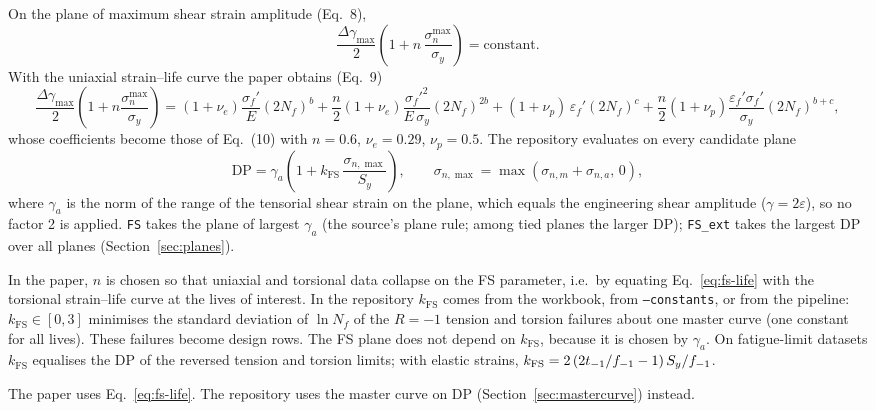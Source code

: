  On the plane of maximum shear strain amplitude (Eq.~8),
\begin{equation}
\frac{\Delta\gamma_{\max}}{2}\left(1+n\,\frac{\sigma_n^{\max}}{\sigma_y}\right)=\text{constant} .
\label{eq:fs-main}
\end{equation}
With the uniaxial strain--life curve the paper obtains (Eq.~9)
\begin{equation}
\frac{\Delta\gamma_{\max}}{2}\left(1+n\frac{\sigma_n^{\max}}{\sigma_y}\right)
=(1+\nu_e)\frac{\sigma_f'}{E}(2N_f)^b+\frac n2(1+\nu_e)\frac{\sigma_f'^2}{E\,\sigma_y}(2N_f)^{2b}
+(1+\nu_p)\,\varepsilon_f'(2N_f)^c+\frac n2(1+\nu_p)\frac{\varepsilon_f'\sigma_f'}{\sigma_y}(2N_f)^{b+c} ,
\label{eq:fs-life}
\end{equation}
whose coefficients become those of Eq.~(10) with $n=0.6$, $\nu_e=0.29$, $\nu_p=0.5$. The repository
evaluates on every candidate plane
\begin{equation}
\mathrm{DP}=\gamma_a\left(1+k_\mathrm{FS}\,\frac{\sigma_{n,\max}}{S_y}\right),\qquad
\sigma_{n,\max}=\max(\sigma_{n,m}+\sigma_{n,a},\,0),
\label{eq:fs-dp}
\end{equation}
where $\gamma_a$ is the norm of the range of the tensorial shear strain on the plane, which equals
the engineering shear amplitude ($\gamma=2\varepsilon$), so no factor 2 is applied. \texttt{FS}
takes the plane of largest $\gamma_a$ (the source's plane rule; among tied planes the larger DP);
\texttt{FS\_ext} takes the largest DP over all planes (Section~\ref{sec:planes}).

 In the paper, $n$ is chosen so that uniaxial and torsional data
collapse on the FS parameter, i.e.\ by equating Eq.~\eqref{eq:fs-life} with the torsional
strain--life curve at the lives of interest. In the repository $k_\mathrm{FS}$ comes from the
workbook, from \texttt{--constants}, or from the pipeline: $k_\mathrm{FS}\in[0,3]$ minimises the
standard deviation of $\ln N_f$ of the $R=-1$ tension and torsion failures about one master curve
(one constant for all lives). These failures become design rows. The FS plane does not depend on
$k_\mathrm{FS}$, because it is chosen by $\gamma_a$. On fatigue-limit datasets $k_\mathrm{FS}$
equalises the DP of the reversed tension and torsion limits; with elastic strains,
$k_\mathrm{FS}=2\,(2t_{-1}/f_{-1}-1)\,S_y/f_{-1}$.

 The paper uses Eq.~\eqref{eq:fs-life}. The repository uses the master curve on DP
(Section~\ref{sec:mastercurve}) instead.


